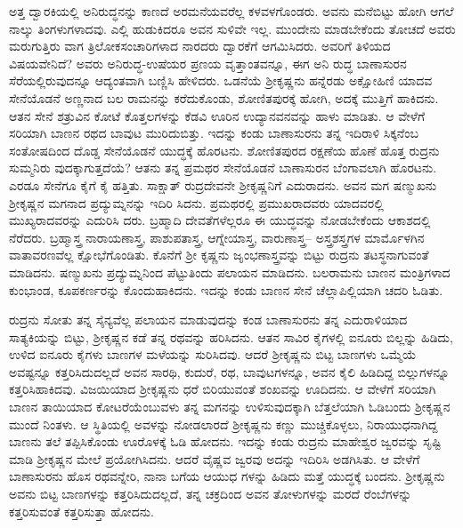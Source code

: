 ಅತ್ತ ದ್ವಾರಕಿಯಲ್ಲಿ ಅನಿರುದ್ಧನನ್ನು ಕಾಣದೆ ಅರಮನೆಯವರೆಲ್ಲ ಕಳವಳಗೊಂಡರು. ಅವನು ಮನೆಬಿಟ್ಟು ಹೋಗಿ ಆಗಲೆ ನಾಲ್ಕು ತಿಂಗಳುಗಳಾದವು. ಎಲ್ಲಿ ಹುಡುಕಿದರೂ ಅವನ ಸುಳಿವೇ ಇಲ್ಲ. ಮುಂದೇನು ಮಾಡಬೇಕೆಂದು ತೋಚದೆ ಅವರು ಮರುಗುತ್ತಿರು ವಾಗ ತ್ರಿಲೋಕಸಂಚಾರಿಗಳಾದ ನಾರದರು ದ್ವಾರಕೆಗೆ ಆಗಮಿಸಿದರು. ಅವರಿಗೆ ತಿಳಿಯದ ವಿಷಯವೇನಿದೆ? ಅವರು ಅನಿರುದ್ಧ-ಉಷೆಯರ ಪ್ರಣಯ ವೃತ್ತಾಂತವನ್ನೂ, ಈಗ ಅನಿ ರುದ್ಧ ಬಾಣಾಸುರನ ಸೆರೆಯಲ್ಲಿರುವುದನ್ನೂ ಆದ್ಯಂತವಾಗಿ ಬಣ್ಣಿಸಿ ಹೇಳಿದರು. ಒಡನೆಯೆ ಶ್ರೀಕೃಷ್ಣನು ಹನ್ನೆರಡು ಅಕ್ಷೋಹಿಣಿ ಯಾದವ ಸೇನೆಯೊಡನೆ ಅಣ್ಣನಾದ ಬಲ ರಾಮನನ್ನು ಕರೆದುಕೊಂಡು, ಶೋಣಿತಪುರಕ್ಕೆ ಹೋಗಿ, ಅದಕ್ಕೆ ಮುತ್ತಿಗೆ ಹಾಕಿದನು. ಆತನ ಸೇನೆ ಶತ್ರುವಿನ ಕೋಟೆ ಕೊತ್ತಲಗಳನ್ನು ಕೆಡವಿ ಊರಿನ ಉದ್ಯಾನವನವನ್ನು ಹಾಳು ಮಾಡಿತು. ಆ ವೇಳೆಗೆ ಸರಿಯಾಗಿ ಬಾಣನ ರಥದ ಬಾವುಟ ಮುರಿದುಬಿತ್ತು. ಇದನ್ನು ಕಂಡು ಬಾಣಾಸುರನು ತನ್ನ ಇದಿರಾಳಿ ಸಿಕ್ಕನೆಂಬ ಸಂತೋಷದಿಂದ ದೊಡ್ಡ ಸೇನೆಯೊಡನೆ ಯುದ್ಧಕ್ಕೆ ಹೊರಟನು. ಶೋಣಿತಪುರದ ರಕ್ಷಣೆಯ ಹೊಣೆ ಹೊತ್ತ ರುದ್ರನು ಸುಮ್ಮನಿರು ವುದಕ್ಕಾಗುತ್ತದೆಯೆ? ಆತನು ತನ್ನ ಪ್ರಮಥರ ಸೇನೆಯೊಡನೆ ಬಾಣಾಸುರನ ಬೆಂಗಾವಲಾಗಿ ಹೊರಟನು. ಎರಡೂ ಸೇನೆಗೂ ಕೈಗೆ ಕೈ ಹತ್ತಿತು. ಸಾಕ್ಷಾತ್ ರುದ್ರದೇವನೇ ಶ್ರೀಕೃಷ್ಣನಿಗೆ ಎದುರಾದನು. ಅವನ ಮಗ ಷಣ್ಮುಖನು ಶ್ರೀಕೃಷ್ಣನ ಮಗನಾದ ಪ್ರದ್ಯುಮ್ನನನ್ನು ಇದಿರಿ ಸಿದನು. ಪ್ರಮಥರಲ್ಲಿ ಪ್ರಮುಖರಾದವರು ಯಾದವರಲ್ಲಿ ಮುಖ್ಯರಾದವರನ್ನು ಎದುರಿಸಿ ದರು. ಬ್ರಹ್ಮಾದಿ ದೇವತೆಗಳೆಲ್ಲರೂ ಈ ಯುದ್ಧವನ್ನು ನೋಡಬೇಕೆಂದು ಆಕಾಶದಲ್ಲಿ ನೆರೆದರು. ಬ್ರಹ್ಮಾಸ್ತ್ರ ನಾರಾಯಣಾಸ್ತ್ರ, ಪಾಶುಪತಾಸ್ತ್ರ, ಆಗ್ನೇಯಾಸ್ತ್ರ, ವಾರುಣಾಸ್ತ್ರ– ಅಸ್ತ್ರಶಸ್ತ್ರಗಳ ಮಾರ್ಮೊಳಗಿನ ವಾತಾವರಣವೆಲ್ಲ ಕ್ಷೋಭೆಗೊಂಡಿತು. ಕೊನೆಗೆ ಶ್ರೀ ಕೃಷ್ಣನು ಜೃಂಭಣಾಸ್ತ್ರವನ್ನು ಬಿಟ್ಟು ರುದ್ರನು ತಟಸ್ಥನಾಗುವಂತೆ ಮಾಡಿದನು. ಷಣ್ಮುಖನು ಪ್ರದ್ಯುಮ್ನನಿಂದ ಪೆಟ್ಟುತಿಂದು ಪಲಾಯನ ಮಾಡಿದನು. ಬಲರಾಮನು ಬಾಣನ ಮಂತ್ರಿಗಳಾದ ಕುಂಭಾಂಡ, ಕೂಪಕರ್ಣರನ್ನು ಕೊಂದುಹಾಕಿದನು. ಇದನ್ನು ಕಂಡು ಬಾಣನ ಸೇನೆ ಚೆಲ್ಲಾಪಿಲ್ಲಿಯಾಗಿ ಚದರಿ ಓಡಿತು.

ರುದ್ರನು ಸೋತು ತನ್ನ ಸೈನ್ಯವೆಲ್ಲ ಪಲಾಯನ ಮಾಡುವುದನ್ನು ಕಂಡ ಬಾಣಾಸುರನು ತನ್ನ ಎದುರಾಳಿಯಾದ ಸಾತ್ಯಕಿಯನ್ನು ಬಿಟ್ಟು, ಶ್ರೀಕೃಷ್ಣನ ಕಡೆ ತನ್ನ ರಥವನ್ನು ಹರಿಸಿದನು. ಆತನ ಸಾವಿರ ಕೈಗಳಲ್ಲಿ ಐನೂರು ಬಿಲ್ಲನ್ನು ಹಿಡಿದು, ಉಳಿದ ಐನೂರು ಕೈಗಳು ಬಾಣಗಳ ಮಳೆಯನ್ನು ಸುರಿಸಿದವು. ಆದರೆ ಶ್ರೀಕೃಷ್ಣನು ಬಿಟ್ಟ ಬಾಣಗಳು ಒಮ್ಮೆಯೆ ಅವಷ್ಟನ್ನೂ ಕತ್ತರಿಸಿದುದಲ್ಲದೆ ಅವನ ಸಾರಥಿ, ಕುದುರೆ, ರಥ, ಬಾವುಟಗಳನ್ನೂ, ಅವನ ಕೈಲಿ ಹಿಡಿದಿದ್ದ ಬಿಲ್ಲುಗಳನ್ನೂ ಕತ್ತರಿಸಿಹಾಕಿದವು. ವಿಜಯಿಯಾದ ಶ್ರೀಕೃಷ್ಣನು ಧರೆ ಬಿರಿಯುವಂತೆ ಶಂಖವನ್ನು ಊದಿದನು. ಆ ವೇಳೆಗೆ ಸರಿಯಾಗಿ ಬಾಣನ ತಾಯಿಯಾದ ಕೋಟರೆಯೆಂಬುವಳು ತನ್ನ ಮಗನನ್ನು ಉಳಿಸುವುದಕ್ಕಾಗಿ ಬೆತ್ತಲೆಯಾಗಿ ಓಡಿಬಂದು ಶ್ರೀಕೃಷ್ಣನ ಮುಂದೆ ನಿಂತಳು. ಆ ಸ್ಥಿತಿಯಲ್ಲಿ ಅವಳನ್ನು ನೋಡಲಾರದೆ ಶ್ರೀಕೃಷ್ಣನು ಕಣ್ಣು ಮುಚ್ಚಿಕೊಳ್ಳಲು, ನಿರಾಯುಧನಾಗಿದ್ದ ಬಾಣನು ತಲೆ ತಪ್ಪಿಸಿಕೊಂಡು ಊರೊಳಕ್ಕೆ ಓಡಿ ಹೋದನು. ಇದನ್ನು ಕಂಡು ರುದ್ರನು ಮಾಹೇಶ್ವರ ಜ್ವರವನ್ನು ಸೃಷ್ಟಿ ಮಾಡಿ ಶ್ರೀಕೃಷ್ಣನ ಮೇಲೆ ಪ್ರಯೋಗಿಸಿದನು. ಆದರೆ ವೈಷ್ಣವ ಜ್ವರವು ಅದನ್ನು ಇದಿರಿಸಿ ಅಡಗಿಸಿತು. ಆ ವೇಳೆಗೆ ಬಾಣಾಸುರನು ಹೊಸ ರಥವನ್ನೇರಿ, ನಾನಾ ಬಗೆಯ ಆಯುಧ ಗಳನ್ನು ಹಿಡಿದು ಮತ್ತೆ ಯುದ್ಧಕ್ಕೆ ಬಂದನು. ಶ್ರೀಕೃಷ್ಣನು ಅವನು ಬಿಟ್ಟ ಬಾಣಗಳನ್ನು ಕತ್ತರಿಸಿದುದಲ್ಲದೆ, ತನ್ನ ಚಕ್ರದಿಂದ ಅವನ ತೋಳುಗಳನ್ನು ಮರದೆ ರೆಂಬೆಗಳನ್ನು ಕತ್ತರಿಸುವಂತೆ ಕತ್ತರಿಸುತ್ತಾ ಹೋದನು.

